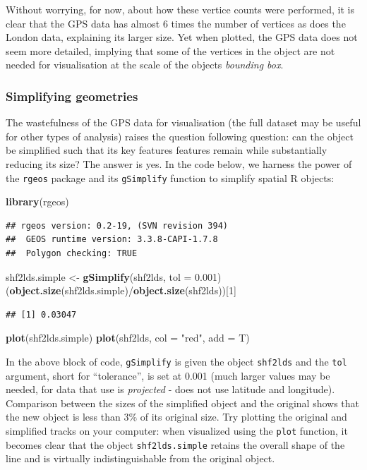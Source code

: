 \documentclass[]{article}
\newenvironment{Shaded}{}{}
\newcommand{\KeywordTok}[1]{\textcolor[rgb]{0.00,0.44,0.13}{\textbf{{#1}}}}
\newcommand{\DataTypeTok}[1]{\textcolor[rgb]{0.56,0.13,0.00}{{#1}}}
\newcommand{\DecValTok}[1]{\textcolor[rgb]{0.25,0.63,0.44}{{#1}}}
\newcommand{\FloatTok}[1]{\textcolor[rgb]{0.25,0.63,0.44}{{#1}}}
\newcommand{\StringTok}[1]{\textcolor[rgb]{0.25,0.44,0.63}{{#1}}}
\newcommand{\NormalTok}[1]{{#1}}
\begin{document}
Without worrying, for now, about how these vertice counts were
performed, it is clear that the GPS data has almost 6 times the number
of vertices as does the London data, explaining its larger size. Yet
when plotted, the GPS data does not seem more detailed, implying that
some of the vertices in the object are not needed for visualisation at
the scale of the objects \emph{bounding box}.

\subsubsection{Simplifying geometries}

The wastefulness of the GPS data for visualisation (the full dataset may
be useful for other types of analysis) raises the question following
question: can the object be simplified such that its key features
features remain while substantially reducing its size? The answer is
yes. In the code below, we harness the power of the \texttt{rgeos}
package and its \texttt{gSimplify} function to simplify spatial R
objects:

\begin{Shaded}
\begin{Highlighting}[]
\KeywordTok{library}\NormalTok{(rgeos)}
\end{Highlighting}
\end{Shaded}
\begin{verbatim}
## rgeos version: 0.2-19, (SVN revision 394)
##  GEOS runtime version: 3.3.8-CAPI-1.7.8 
##  Polygon checking: TRUE
\end{verbatim}
\begin{Shaded}
\begin{Highlighting}[]
\NormalTok{shf2lds.simple <- }\KeywordTok{gSimplify}\NormalTok{(shf2lds, }\DataTypeTok{tol =} \FloatTok{0.001}\NormalTok{)}
\NormalTok{(}\KeywordTok{object.size}\NormalTok{(shf2lds.simple)/}\KeywordTok{object.size}\NormalTok{(shf2lds))[}\DecValTok{1}\NormalTok{]}
\end{Highlighting}
\end{Shaded}
\begin{verbatim}
## [1] 0.03047
\end{verbatim}
\begin{Shaded}
\begin{Highlighting}[]
\KeywordTok{plot}\NormalTok{(shf2lds.simple)}
\KeywordTok{plot}\NormalTok{(shf2lds, }\DataTypeTok{col =} \StringTok{"red"}\NormalTok{, }\DataTypeTok{add =} \NormalTok{T)}
\end{Highlighting}
\end{Shaded}
In the above block of code, \texttt{gSimplify} is given the object
\texttt{shf2lds} and the \texttt{tol} argument, short for ``tolerance'',
is set at 0.001 (much larger values may be needed, for data that use is
\emph{projected} - does not use latitude and longitude). Comparison
between the sizes of the simplified object and the original shows that
the new object is less than 3\% of its original size. Try plotting the
original and simplified tracks on your computer: when visualized using
the \texttt{plot} function, it becomes clear that the object
\texttt{shf2lds.simple} retains the overall shape of the line and is
virtually indistinguishable from the original object.
\end{document}
